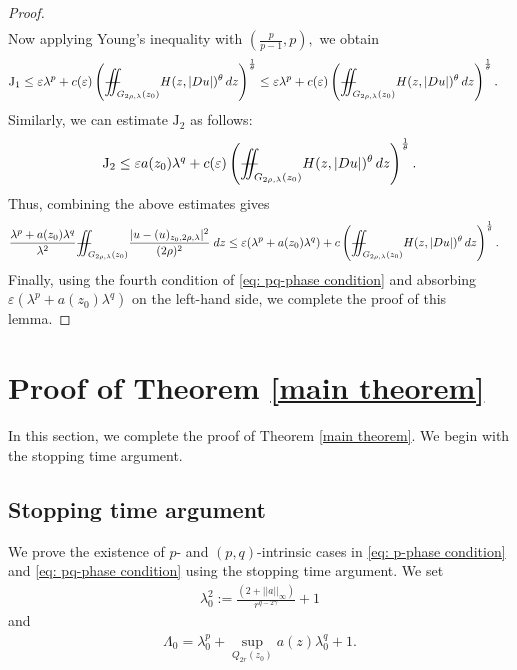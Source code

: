 \documentclass[notitlepage,11pt,reqno]{amsart}
\theoremstyle{definition}
\numberwithin{equation}{section}
\newcommand{\iintss}{{\int\hspace{-0.28cm}\int}}
\newcommand{ \miints }{{\iintss\hspace{-0.56cm} -\hspace{-0.15cm}-}}
\newcommand{\miint}[1]{{\miints_{\hspace{-0.13cm}#1}}}
\begin{document}
\begin{proof}
\begin{align*}
\end{align*}
Now applying Young's inequality with $(\frac{p}{p-1}, p),$ we obtain
\begin{align*}
    \mathrm{J}_1 &\leq \varepsilon \lambda^{p}+ c(\varepsilon)\left(\miint{G_{2\rho, \lambda}(z_0)}H(z, |Du|)^{\theta}\,dz\right)^{\frac{1}{\theta }}\leq \varepsilon \lambda^p+ c(\varepsilon)\left(\miint{G_{2 \rho,\lambda}\left(z_0\right)} H(z, |Du|)^{\theta}\, dz\right)^{\frac{1}{\theta}}.
\end{align*}
Similarly, we can estimate $\mathrm{J}_2$ as follows:
\begin{align*}
    \mathrm{J}_2 \leq \varepsilon a(z_0)\lambda^q + c(\varepsilon)\left(\miint{G_{2 \rho,\lambda}\left(z_0\right)} H(z, |Du|)^{\theta}\, dz\right)^{\frac{1}{\theta}}.
\end{align*}
Thus, combining the above estimates gives
\begin{align*}
 &\frac{\lambda^p+a(z_0)\lambda^q}{\lambda^2}\miint{G_{2\rho, \lambda}(z_0)}\frac{|u-(u)_{z_0, 2\rho, \lambda}|^2}{(2\rho)^2}\;dz \leq \varepsilon (\lambda^p+a(z_0)\lambda^q)+c\left(\miint{G_{2 \rho,\lambda}\left(z_0\right)} H(z, |Du|)^{\theta}\, dz\right)^{\frac{1}{\theta}}. 
\end{align*}
Finally, using the fourth condition of \eqref{eq: pq-phase condition} and absorbing $\varepsilon (\lambda^p+a(z_0)\lambda^q)$ on the left-hand side, we complete the proof of this lemma.
\end{proof}
\section{Proof of Theorem \ref{main theorem}} In this section, we complete the proof of Theorem \ref{main theorem}. We begin with the stopping time argument.
\subsection{Stopping time argument}\label{subsec: stopping time}
We prove the existence of $p$- and $(p, q)$-intrinsic cases in \eqref{eq: p-phase condition} and \eqref{eq: pq-phase condition} using the stopping time argument. We set
\begin{align}\label{defn: la_0}
    \lambda^2_0:=\frac{\left(2+||a||_{\infty}\right)}{r^{q-2\gamma}}+1
\end{align}
and 
\begin{align}\label{defn: La_0}
    \Lambda_0=\lambda_0^p+\sup_{Q_{2r}(z_0)}a(z)\lambda_0^q+1.
\end{align}
\end{document}

